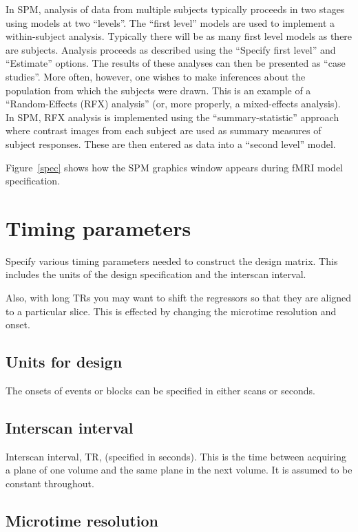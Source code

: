 In SPM, analysis of data from multiple subjects typically proceeds in two stages using models at two ``levels''. The ``first level'' models are used to implement a within-subject analysis. Typically there will be as many first level models as there are subjects. Analysis proceeds as described using the ``Specify first level'' and ``Estimate'' options. The results of these analyses can then be presented as ``case studies''. More often, however, one wishes to make inferences about the population from which the subjects were drawn. This is an example of a ``Random-Effects (RFX) analysis'' (or, more properly, a mixed-effects analysis). In SPM, RFX analysis is implemented using the ``summary-statistic'' approach where contrast images from each subject are used as summary measures of subject responses. These are then entered as data into a ``second level'' model.

Figure~\ref{spec} shows how the SPM graphics window appears during fMRI model specification.

\section{Timing parameters}

Specify various timing parameters needed to construct the design matrix. This includes the units of the design specification and the interscan interval.

Also, with long TRs you may want to shift the regressors so that they are aligned to a particular slice.  This is effected by changing the microtime resolution and onset.

\subsection{Units for design}

The onsets of events or blocks can be specified in either scans or seconds.

\subsection{Interscan interval}

Interscan interval, TR, (specified in seconds).  This is the time between acquiring a plane of one volume and the same plane in the next volume.  It is assumed to be constant throughout.

\subsection{Microtime resolution}


